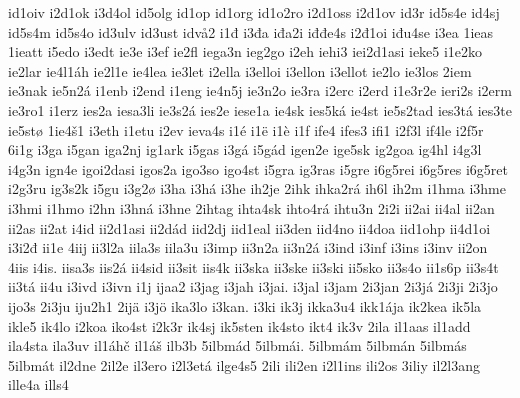 {    id1oiv
    i2d1ok
    i3d4ol
    id5olg
    id1op
    id1org
    id1o2ro
    i2d1oss
    i2d1ov
    id3r
    id5s4e
    id4sj
    id5s4m
    id5s4o
    id3ulv
    id3ust
    idvå2
    i1đ
    i3đa
    iđa2i
    iđđe4s
    i2đ1oi
    iđu4se
    i3ea
    1ieas
    1ieatt
    i5edo
    i3edt
    ie3e
    i3ef
    ie2fl
    iega3n
    ieg2go
    i2eh
    iehi3
    iei2d1asi
    ieke5
    i1e2ko
    ie2lar
    ie4l1áh
    ie2l1e
    ie4lea
    ie3let
    i2ella
    i3elloi
    i3ellon
    i3ellot
    ie2lo
    ie3los
    2iem
    ie3nak
    ie5n2á
    i1enb
    i2end
    i1eng
    ie4n5j
    ie3n2o
    ie3ra
    i2erc
    i2erd
    i1e3r2e
    ieri2s
    i2erm
    ie3ro1
    i1erz
    ies2a
    iesa3li
    ie3s2á
    ies2e
    iese1a
    ie4sk
    ies5ká
    ie4st
    ie5s2tad
    ies3tá
    ies3te
    ie5stø
    1ie4š1
    i3eth
    i1etu
    i2ev
    ieva4s
    i1é
    i1ë
    i1è
    i1f
    ife4
    ifes3
    ifi1
    i2f3l
    if4le
    i2f5r
    6i1g
    i3ga
    i5gan
    iga2nj
    ig1ark
    i5gas
    i3gá
    i5gád
    igen2e
    ige5sk
    ig2goa
    ig4hl
    i4g3l
    i4g3n
    ign4e
    igoi2dasi
    igos2a
    igo3so
    igo4st
    i5gra
    ig3ras
    i5gre
    i6g5rei
    i6g5res
    i6g5ret
    i2g3ru
    ig3s2k
    i5gu
    i3g2ø
    i3ha
    i3há
    i3he
    ih2je
    2ihk
    ihka2rá
    ih6l
    ih2m
    i1hma
    i3hme
    i3hmi
    i1hmo
    i2hn
    i3hná
    i3hne
    2ihtag
    ihta4sk
    ihto4rá
    ihtu3n
    2i2i
    ii2ai
    ii4al
    ii2an
    ii2as
    ii2at
    i4id
    ii2d1asi
    ii2dád
    iid2dj
    iid1eal
    ii3den
    iid4no
    ii4doa
    iid1ohp
    ii4d1oi
    i3i2đ
    ii1e
    4iij
    ii3l2a
    iila3s
    iila3u
    i3imp
    ii3n2a
    ii3n2á
    i3ind
    i3inf
    i3ins
    i3inv
    ii2on
    4iis
    i4is.
    iisa3s
    iis2á
    ii4sid
    ii3sit
    iis4k
    ii3ska
    ii3ske
    ii3ski
    ii5sko
    ii3s4o
    ii1s6p
    ii3s4t
    ii3tá
    ii4u
    i3ivd
    i3ivn
    i1j
    ijaa2
    i3jag
    i3jah
    i3jai.
    i3jal
    i3jam
    2i3jan
    2i3já
    2i3ji
    2i3jo
    ijo3s
    2i3ju
    iju2h1
    2ijä
    i3jö
    ika3lo
    i3kan.
    i3ki
    ik3j
    ikka3u4
    ikk1ája
    ik2kea
    ik5la
    ikle5
    ik4lo
    i2koa
    iko4st
    i2k3r
    ik4sj
    ik5sten
    ik4sto
    ikt4
    ik3v
    2ila
    il1aas
    il1add
    ila4sta
    ila3uv
    il1áhč
    il1áš
    ilb3b
    5ilbmád
    5ilbmái.
    5ilbmám
    5ilbmán
    5ilbmás
    5ilbmát
    il2dne
    2il2e
    il3ero
    i2l3etá
    ilge4s5
    2ili
    ili2en
    i2l1ins
    ili2os
    3iliy
    il2l3ang
    ille4a
    ills4
}
